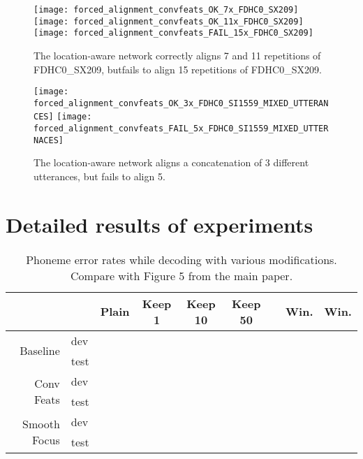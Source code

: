 \documentclass{article}
\begin{document}
\begin{sidewaysfigure}[h]
  \texttt{[image: forced\_alignment\_convfeats\_OK\_7x\_FDHC0\_SX209]}
  \texttt{[image: forced\_alignment\_convfeats\_OK\_11x\_FDHC0\_SX209]}
  \texttt{[image: forced\_alignment\_convfeats\_FAIL\_15x\_FDHC0\_SX209]}
  \caption{The location-aware network correctly aligns 7 and 11
    repetitions of FDHC0\_SX209, butfails to align 15 repetitions
    of FDHC0\_SX209.}
\end{sidewaysfigure}

\begin{sidewaysfigure}[h]
  \texttt{[image: forced\_alignment\_convfeats\_OK\_3x\_FDHC0\_SI1559\_MIXED\_UTTERANCES]}
  \texttt{[image: forced\_alignment\_convfeats\_FAIL\_5x\_FDHC0\_SI1559\_MIXED\_UTTERNACES]}
  \caption{The location-aware network aligns a concatenation of 3 different
    utterances, but fails to align 5.}
\end{sidewaysfigure}

\clearpage
\section{Detailed results of experiments}

\begin{table}[h]
  \centering
  \caption{Phoneme error rates while decoding with various
    modifications. Compare with Figure 5 from the main paper.}
\setlength\tabcolsep{5pt}
\begin{tabular}{rl|c|c|c|c|c|c|c}
             &         &   Plain  &  Keep 1  & Keep 10  & Keep 50  &
              & Win.  & Win.  \\ \hline \hline
\multirow{2}{*}{Baseline} &     dev &  &  &  &  &    &        &         \\
             &    test &  &  &  &  &
              &        &         \\ \hline
\multirow{2}{*}{Conv Feats} &     dev &  &  &  &  &    &        &         \\
             &    test &  &  &  &  &
              &        &         \\ \hline
\multirow{2}{*}{Smooth Focus} &     dev &  &  &  &  &    &        &         \\
             &    test &  &  &  &  &    &        &         \\
\end{tabular}
  \label{tab:decoding_singles}
\end{table}


 
\end{document}
